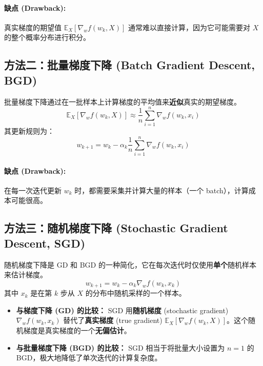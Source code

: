 \documentclass[12pt, a4paper]{article}
\newcommand{\E}{\mathbb{E}} %
\begin{document}
\paragraph{缺点 (Drawback):} 真实梯度的期望值 $\E_X[\nabla_w f(w_k, X)]$ 通常难以直接计算，因为它可能需要对 $X$ 的整个概率分布进行积分。

\subsection{方法二：批量梯度下降 (Batch Gradient Descent, BGD)}
批量梯度下降通过在一批样本上计算梯度的平均值来\textbf{近似}真实的期望梯度。
\[
\E_X[\nabla_w f(w_k, X)] \approx \frac{1}{n} \sum_{i=1}^{n} \nabla_w f(w_k, x_i)
\]
其更新规则为：
\[
w_{k+1} = w_k - \alpha_k \frac{1}{n} \sum_{i=1}^{n} \nabla_w f(w_k, x_i)
\]
\paragraph{缺点 (Drawback):} 在每一次迭代更新 $w_k$ 时，都需要采集并计算大量的样本（一个 batch），计算成本可能很高。

\subsection{方法三：随机梯度下降 (Stochastic Gradient Descent, SGD)}
随机梯度下降是 GD 和 BGD 的一种简化，它在每次迭代时仅使用\textbf{单个}随机样本来估计梯度。
\[
w_{k+1} = w_k - \alpha_k \nabla_w f(w_k, x_k)
\]
其中 $x_k$ 是在第 $k$ 步从 $X$ 的分布中随机采样的一个样本。

\begin{itemize}
    \item \textbf{与梯度下降 (GD) 的比较：} SGD 用\textbf{随机梯度} (stochastic gradient) $\nabla_w f(w_k, x_k)$ 替代了\textbf{真实梯度} (true gradient) $\E_X[\nabla_w f(w_k, X)]$。这个随机梯度是真实梯度的一个\textbf{无偏估计}。
    \item \textbf{与批量梯度下降 (BGD) 的比较：} SGD 相当于将批量大小设置为 $n=1$ 的 BGD，极大地降低了单次迭代的计算复杂度。
\end{itemize}
\end{document}

